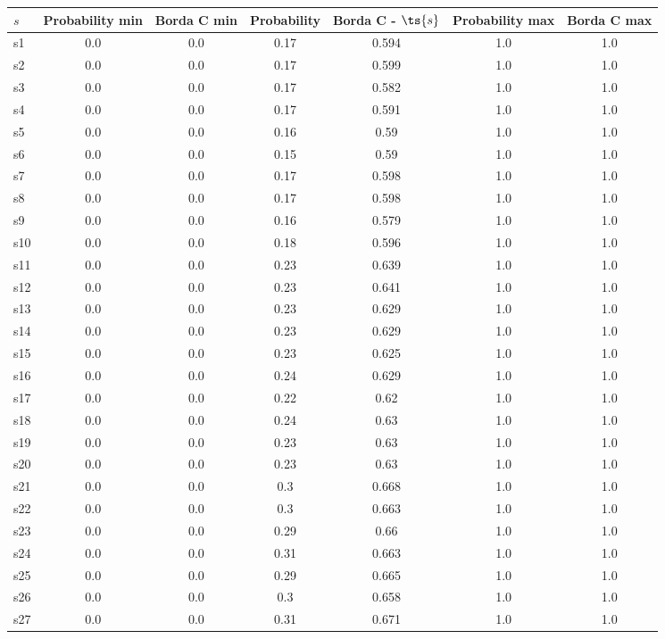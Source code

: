 \documentclass{article}
\begin{document}
\noindent\begin{tabular}{|l|c|c|c|c|c|c|}
\hline
$s$& Probability min & Borda C min & Probability & Borda C - $\ts{s}$ & Probability max & Borda C max\\
\hline
s1 &0.0 & 0.0 & 0.17 & 0.594 & 1.0 & 1.0\\
\hline
s2 &0.0 & 0.0 & 0.17 & 0.599 & 1.0 & 1.0\\
\hline
s3 &0.0 & 0.0 & 0.17 & 0.582 & 1.0 & 1.0\\
\hline
s4 &0.0 & 0.0 & 0.17 & 0.591 & 1.0 & 1.0\\
\hline
s5 &0.0 & 0.0 & 0.16 & 0.59 & 1.0 & 1.0\\
\hline
s6 &0.0 & 0.0 & 0.15 & 0.59 & 1.0 & 1.0\\
\hline
s7 &0.0 & 0.0 & 0.17 & 0.598 & 1.0 & 1.0\\
\hline
s8 &0.0 & 0.0 & 0.17 & 0.598 & 1.0 & 1.0\\
\hline
s9 &0.0 & 0.0 & 0.16 & 0.579 & 1.0 & 1.0\\
\hline
s10 &0.0 & 0.0 & 0.18 & 0.596 & 1.0 & 1.0\\
\hline
s11 &0.0 & 0.0 & 0.23 & 0.639 & 1.0 & 1.0\\
\hline
s12 &0.0 & 0.0 & 0.23 & 0.641 & 1.0 & 1.0\\
\hline
s13 &0.0 & 0.0 & 0.23 & 0.629 & 1.0 & 1.0\\
\hline
s14 &0.0 & 0.0 & 0.23 & 0.629 & 1.0 & 1.0\\
\hline
s15 &0.0 & 0.0 & 0.23 & 0.625 & 1.0 & 1.0\\
\hline
s16 &0.0 & 0.0 & 0.24 & 0.629 & 1.0 & 1.0\\
\hline
s17 &0.0 & 0.0 & 0.22 & 0.62 & 1.0 & 1.0\\
\hline
s18 &0.0 & 0.0 & 0.24 & 0.63 & 1.0 & 1.0\\
\hline
s19 &0.0 & 0.0 & 0.23 & 0.63 & 1.0 & 1.0\\
\hline
s20 &0.0 & 0.0 & 0.23 & 0.63 & 1.0 & 1.0\\
\hline
s21 &0.0 & 0.0 & 0.3 & 0.668 & 1.0 & 1.0\\
\hline
s22 &0.0 & 0.0 & 0.3 & 0.663 & 1.0 & 1.0\\
\hline
s23 &0.0 & 0.0 & 0.29 & 0.66 & 1.0 & 1.0\\
\hline
s24 &0.0 & 0.0 & 0.31 & 0.663 & 1.0 & 1.0\\
\hline
s25 &0.0 & 0.0 & 0.29 & 0.665 & 1.0 & 1.0\\
\hline
s26 &0.0 & 0.0 & 0.3 & 0.658 & 1.0 & 1.0\\
\hline
s27 &0.0 & 0.0 & 0.31 & 0.671 & 1.0 & 1.0\\

\end{tabular}
\end{document}
